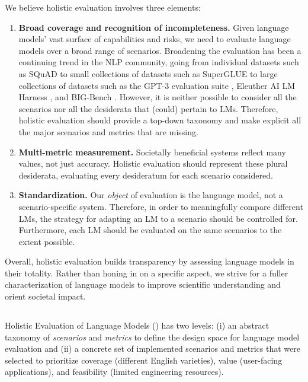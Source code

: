 \noindent We believe holistic evaluation involves three elements:
\begin{enumerate}
\item \textbf{Broad coverage and recognition of incompleteness.}
Given language models' vast surface of capabilities and risks,
we need to evaluate language models over a broad range of scenarios.
Broadening the evaluation has been a continuing trend in the NLP community, 
going from individual datasets such as SQuAD \citep{rajpurkar2016squad}
to small collections of datasets such as SuperGLUE \citep{wang2019glue}
to large collections of datasets such as the GPT-3 evaluation suite \citep{brown2020gpt3}, Eleuther AI LM Harness \citep{gao2021harness}, and BIG-Bench \citep{srivastava2022bigbench}.
However, it is neither possible to consider all the scenarios nor all the desiderata that (could) pertain to LMs.
Therefore, holistic evaluation should provide a top-down taxonomy and make explicit all the major scenarios and metrics that are missing.
\item \textbf{Multi-metric measurement.}
Societally beneficial systems reflect many values, not just accuracy.
Holistic evaluation should represent these plural desiderata, evaluating every desideratum for each scenario considered.
\item \textbf{Standardization.}
Our \emph{object} of evaluation is the language model, not a scenario-specific system.  Therefore, in order to meaningfully compare different LMs, the strategy for adapting an LM to a scenario should be controlled for.  Furthermore, each LM should be evaluated on the same scenarios to the extent possible.
\end{enumerate}
Overall, holistic evaluation builds transparency by assessing language models in their totality.
Rather than honing in on a specific aspect, we strive for a fuller characterization of language models to improve scientific understanding and orient societal impact.

\hypertarget{helm}{\subsection{\benchmarkname}}
\label{sec:helm}
Holistic Evaluation of Language Models (\benchmarkname) has two levels:
(i) an abstract taxonomy of \textit{scenarios} and \textit{metrics} to define the design space for language model evaluation 
and (ii) a concrete set of implemented scenarios and metrics that were selected to prioritize coverage (\eg different English varieties), value (\eg user-facing applications), and feasibility (\eg limited engineering resources).

